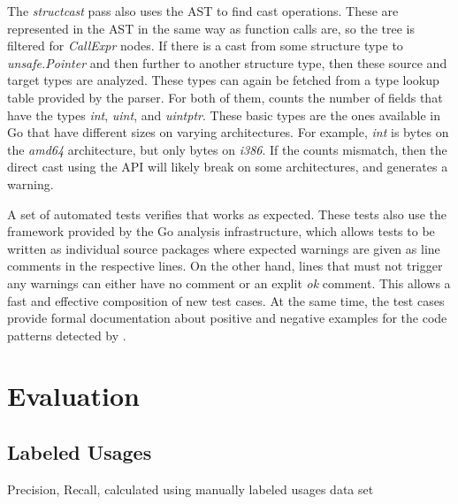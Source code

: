 The \textit{structcast} pass also uses the \acrshort{AST} to find cast operations.
These are represented in the \acrshort{AST} in the same way as function calls are, so the tree is filtered for
\textit{CallExpr} nodes.
If there is a cast from some structure type to \textit{unsafe.Pointer} and then further to another structure type, then
these source and target types are analyzed.
These types can again be fetched from a type lookup table provided by the parser.
For both of them, \toolSafer{} counts the number of fields that have the types \textit{int}, \textit{uint}, and
\textit{uintptr}.
These  basic types are the ones available in Go that have different sizes on varying architectures.
For example, \textit{int} is  bytes on the \textit{amd64} architecture, but only  bytes
on \textit{i386}.
If the counts mismatch, then the direct cast using the \unsafe{} \acrshort{API} will likely break on some architectures,
and \toolSafer{} generates a warning.

A set of automated tests verifies that \toolSafer{} works as expected.
These tests also use the framework provided by the Go analysis infrastructure, which allows tests to be written as
individual source packages where expected warnings are given as line comments in the respective lines.
On the other hand, lines that must not trigger any warnings can either have no comment or an explit \textit{ok} comment.
This allows a fast and effective composition of new test cases.
At the same time, the test cases provide formal documentation about positive and negative examples for the code patterns
detected by \toolSafer{}.



\section{Evaluation}\label{sec:go-safer:evaluation}



\subsection{Labeled Usages}\label{subsec:go-safer:evaluation:labeled-usages}

Precision, Recall, calculated using manually labeled usages data set

